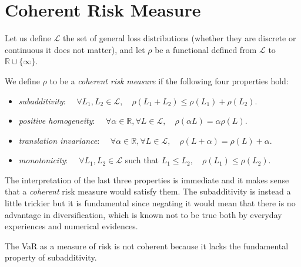 \chapter{Coherent Risk Measure}
\label{app:_risk_measure}

Let us define $\mathcal{L}$ the set of general loss distributions (whether they are discrete or continuous it does not matter), and let $\rho$ be a functional defined from $\mathcal{L}$ to $\mathbb{R} \cup \{\infty\}$.

We define $\rho$ to be a \textit{coherent risk measure} if the following four properties hold:

\begin{itemize}
	\item \textit{subadditivity}: $\quad \forall L_1,L_2 \in \mathcal{L}, \quad \rho(L_1+L_2) \leq \rho(L_1)+ \rho(L_2)$.
	\item \textit{positive homogeneity}: $\quad \forall  \alpha \in \mathbb{R}, \forall L \in \mathcal{L},  \quad \rho(\alpha L) =\alpha \rho(L)$.
	\item  \textit{translation invariance}: $\quad \forall  \alpha \in \mathbb{R}, \forall L \in \mathcal{L},  \quad \rho(L+ \alpha) = \rho(L) + \alpha$.
	\item \textit{monotonicity}: $\quad \forall L_1,L_2 \in \mathcal{L} $ such that $L_1 \leq L_2, \quad \rho(L_1) \leq \rho(L_2)$.
\end{itemize}

The interpretation of the last three properties is immediate and it makes sense that a \textit{coherent} risk measure would satisfy them. The subadditivity is instead a little trickier but it is fundamental since negating it would mean that there is no advantage in diversification, which is known not to be true both by everyday experiences and numerical evidences.

The VaR as a measure of risk is not coherent because it lacks the fundamental property of subadditivity.